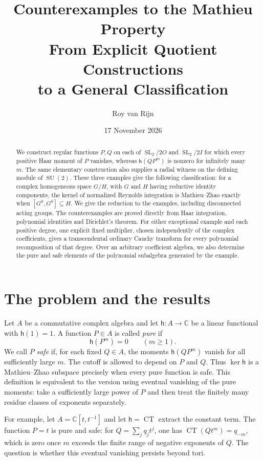 \documentclass[11pt]{article}
\title{Counterexamples to the Mathieu Property\\[6pt]
{\large From Explicit Quotient Constructions\\
to a General Classification}}
\author{Roy van Rijn}
\date{17 November 2026}
\numberwithin{equation}{section}
\theoremstyle{definition}
\theoremstyle{remark}
\newcommand{\C}{\mathbb C}
\newcommand{\h}{\mathsf h}
\newcommand{\CT}{\operatorname{CT}}
\newcommand{\SL}{\operatorname{SL}}
\newcommand{\SU}{\operatorname{SU}}
\begin{document}
\maketitle

\begin{abstract}
We construct regular functions $P,Q$ on each of $\SL_2/2O$ and
$\SL_2/2I$ for which every positive Haar moment of $P$ vanishes, whereas
$\h(QP^m)$ is nonzero for infinitely many $m$. The same elementary
construction also supplies a radial witness on the defining module of
$\SU(2)$. These three examples give the following classification: for a
complex homogeneous space $G/H$, with $G$ and $H$ having reductive identity
components, the kernel of normalized Reynolds integration is
Mathieu--Zhao exactly when $[G^0,G^0]\subseteq H$. We give the reduction
to the examples, including disconnected acting groups. The counterexamples
are proved directly from Haar integration, polynomial identities and
Dirichlet's theorem. For either exceptional example and each positive
degree, one explicit fixed multiplier, chosen independently of the
complex coefficients, gives a transcendental ordinary Cauchy transform
for every polynomial recomposition of that degree. Over an arbitrary coefficient algebra,
we also determine the pure and safe elements of the polynomial subalgebra
generated by the example.
\end{abstract}

\section{The problem and the results}\label{sec:intro}

Let $A$ be a commutative complex algebra and let $\h:A\to\C$ be a
linear functional with $\h(1)=1$. A function $P\in A$ is called
\emph{pure} if
\[
   \h(P^m)=0\qquad(m\geq1).
\]
We call $P$ \emph{safe} if, for each fixed $Q\in A$, the moments
$\h(QP^m)$ vanish for all sufficiently large $m$. The cutoff is allowed
to depend on $P$ and $Q$. Thus $\ker\h$ is a Mathieu--Zhao subspace
precisely when every pure function is safe. This definition is equivalent
to the version using eventual vanishing of the pure moments: take a
sufficiently large power of $P$ and then treat the finitely many residue
classes of exponents separately.

For example, let $A=\C[t,t^{-1}]$ and let $\h=\CT$ extract the
constant term. The function $P=t$ is pure and safe: for
$Q=\sum_jq_jt^j$, one has $\CT(Qt^m)=q_{-m}$, which is zero once
$m$ exceeds the finite range of negative exponents of $Q$. The question
is whether this eventual vanishing persists beyond tori.
\end{document}
